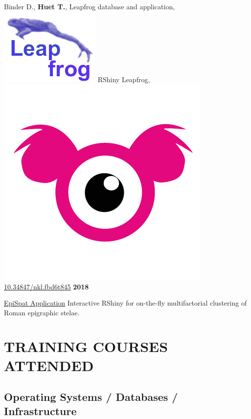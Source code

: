 \documentclass{article}
\newcommand{\fr}[1]{}       %
\newcommand{\en}[1]{#1}     %
\begin{document}
\en{Binder D., \textbf{Huet T.}, Leapfrog database and application, \href{https://devr.cepam.cnrs.fr/shinyapps/leap/}{\includegraphics[scale=0.10]{prj_leapfrog-blue.png}} \textsf{RShiny} Leapfrog, \href{https://nakala.fr/10.34847/nkl.fbd6t845}{\includegraphics[scale=0.03]{lod-nakala.png} 10.34847/nkl.fbd6t845}}
\textbf{2018 }
\fr{\href{https://epispat.shinyapps.io/analyses_mult_5/}{Application EpiSpat} \textsf{RShiny} interactive pour le regroupement multifactoriel à la volée des stèles épigraphiques romaines.}
\en{\href{https://epispat.shinyapps.io/analyses_mult_5/}{EpiSpat Application} Interactive \textsf{RShiny} for on-the-fly multifactorial clustering of Roman epigraphic stelae.}
\smallbreak


\section*{\fr{FORMATION SUIVIES}\en{TRAINING COURSES ATTENDED}}

\subsection*{\fr{Systèmes d'exploitation / Bases de données / Infrastructures}\en{Operating Systems / Databases / Infrastructure}}
\end{document}
